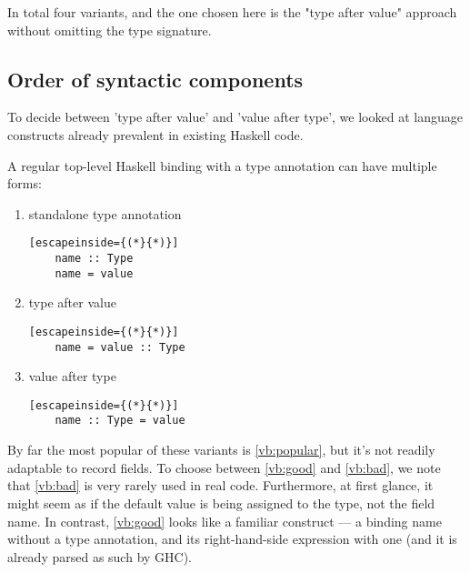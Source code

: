 \documentclass[en]{pracamgr}
\begin{document}
In total four variants, and the one chosen here is the "type after value" approach without omitting the type signature.
\subsection{Order of syntactic components}
To decide between 'type after value' and 'value after type', we looked at language constructs already prevalent in existing Haskell code.

A regular top-level Haskell binding with a type annotation can have multiple forms:
\begin{enumerate}
  \item \label{vb:popular} standalone type annotation
  \begin{lstlisting}[escapeinside={(*}{*)}]
    name :: Type 
    name = value
  \end{lstlisting}
  \item \label{vb:good} type after value
  \begin{lstlisting}[escapeinside={(*}{*)}]
    name = value :: Type
  \end{lstlisting}  
  \item \label{vb:bad} value after type
  \begin{lstlisting}[escapeinside={(*}{*)}]
    name :: Type = value
  \end{lstlisting}
\end{enumerate}

By far the most popular of these variants is \ref*{vb:popular}, but it's not readily adaptable to record fields.
To choose between \ref*{vb:good} and \ref*{vb:bad}, we note that \ref*{vb:bad} is very rarely used in real code.
Furthermore, at first glance, it might seem as if the default value is being assigned to the type, not the field name.
In contrast, \ref*{vb:good} looks like a familiar construct --- a binding name without a type annotation, and its right-hand-side expression with one (and it is already parsed as such by GHC).
\end{document}
